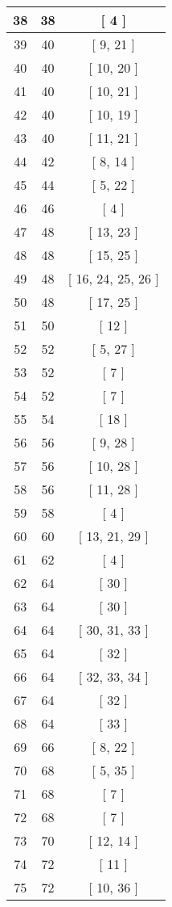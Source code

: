 \begin{center}
\begin{longtable}[H]{|| c c c ||}
\\\hline
38 & 38 & [ 4 ]
\\\hline
39 & 40 & [ 9, 21 ]
\\\hline
40 & 40 & [ 10, 20 ]
\\\hline
41 & 40 & [ 10, 21 ]
\\\hline
42 & 40 & [ 10, 19 ]
\\\hline
43 & 40 & [ 11, 21 ]
\\\hline
44 & 42 & [ 8, 14 ]
\\\hline
45 & 44 & [ 5, 22 ]
\\\hline
46 & 46 & [ 4 ]
\\\hline
47 & 48 & [ 13, 23 ]
\\\hline
48 & 48 & [ 15, 25 ]
\\\hline
49 & 48 & [ 16, 24, 25, 26 ]
\\\hline
50 & 48 & [ 17, 25 ]
\\\hline
51 & 50 & [ 12 ]
\\\hline
52 & 52 & [ 5, 27 ]
\\\hline
53 & 52 & [ 7 ]
\\\hline
54 & 52 & [ 7 ]
\\\hline
55 & 54 & [ 18 ]
\\\hline
56 & 56 & [ 9, 28 ]
\\\hline
57 & 56 & [ 10, 28 ]
\\\hline
58 & 56 & [ 11, 28 ]
\\\hline
59 & 58 & [ 4 ]
\\\hline
60 & 60 & [ 13, 21, 29 ]
\\\hline
61 & 62 & [ 4 ]
\\\hline
62 & 64 & [ 30 ]
\\\hline
63 & 64 & [ 30 ]
\\\hline
64 & 64 & [ 30, 31, 33 ]
\\\hline
65 & 64 & [ 32 ]
\\\hline
66 & 64 & [ 32, 33, 34 ]
\\\hline
67 & 64 & [ 32 ]
\\\hline
68 & 64 & [ 33 ]
\\\hline
69 & 66 & [ 8, 22 ]
\\\hline
70 & 68 & [ 5, 35 ]
\\\hline
71 & 68 & [ 7 ]
\\\hline
72 & 68 & [ 7 ]
\\\hline
73 & 70 & [ 12, 14 ]
\\\hline
74 & 72 & [ 11 ]
\\\hline
75 & 72 & [ 10, 36 ]

\end{longtable}
\end{center}
